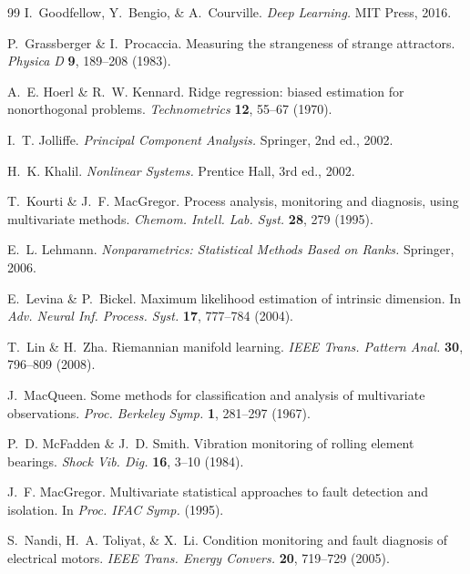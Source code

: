 \documentclass[11pt]{article}
\begin{document}
\begin{thebibliography}{99}
I.~Goodfellow, Y.~Bengio, \& A.~Courville.
\emph{Deep Learning.}
MIT Press, 2016.

P.~Grassberger \& I.~Procaccia.
Measuring the strangeness of strange attractors.
\emph{Physica D} \textbf{9}, 189--208 (1983).

A.~E. Hoerl \& R.~W. Kennard.
Ridge regression: biased estimation for nonorthogonal problems.
\emph{Technometrics} \textbf{12}, 55--67 (1970).

I.~T. Jolliffe.
\emph{Principal Component Analysis.}
Springer, 2nd ed., 2002.

H.~K. Khalil.
\emph{Nonlinear Systems.}
Prentice Hall, 3rd ed., 2002.

T.~Kourti \& J.~F. MacGregor.
Process analysis, monitoring and diagnosis, using multivariate methods.
\emph{Chemom. Intell. Lab. Syst.} \textbf{28}, 279 (1995).

E.~L. Lehmann.
\emph{Nonparametrics: Statistical Methods Based on Ranks.}
Springer, 2006.

E.~Levina \& P.~Bickel.
Maximum likelihood estimation of intrinsic dimension.
In \emph{Adv. Neural Inf. Process. Syst.} \textbf{17}, 777--784 (2004).

T.~Lin \& H.~Zha.
Riemannian manifold learning.
\emph{IEEE Trans. Pattern Anal.} \textbf{30}, 796--809 (2008).

J.~MacQueen.
Some methods for classification and analysis of multivariate
observations.
\emph{Proc. Berkeley Symp.} \textbf{1}, 281--297 (1967).

P.~D. McFadden \& J.~D. Smith.
Vibration monitoring of rolling element bearings.
\emph{Shock Vib. Dig.} \textbf{16}, 3--10 (1984).

J.~F. MacGregor.
Multivariate statistical approaches to fault detection and isolation.
In \emph{Proc. IFAC Symp.} (1995).

S.~Nandi, H.~A. Toliyat, \& X.~Li.
Condition monitoring and fault diagnosis of electrical motors.
\emph{IEEE Trans. Energy Convers.} \textbf{20}, 719--729 (2005).


\end{thebibliography}
\end{document}
